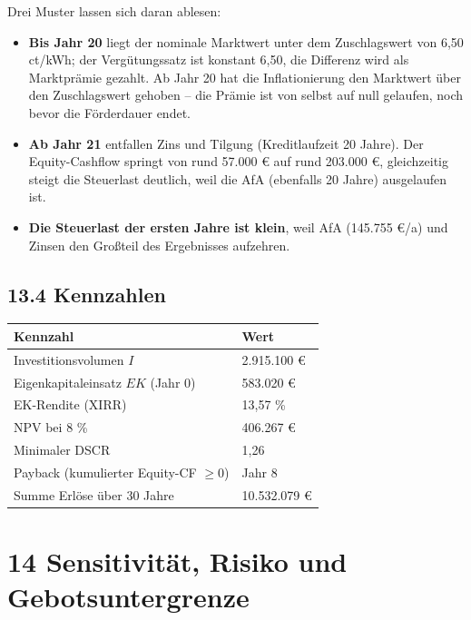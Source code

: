 \documentclass[
  a4paper,
  10pt]{article}
\providecommand{\tightlist}{%
  \setlength{\itemsep}{0pt}\setlength{\parskip}{0pt}}
\begin{document}
Drei Muster lassen sich daran ablesen:

\begin{itemize}
\tightlist
\item
  \textbf{Bis Jahr 20} liegt der nominale Marktwert unter dem
  Zuschlagswert von 6,50 ct/kWh; der Vergütungssatz ist konstant 6,50,
  die Differenz wird als Marktprämie gezahlt. Ab Jahr 20 hat die
  Inflationierung den Marktwert über den Zuschlagswert gehoben -- die
  Prämie ist von selbst auf null gelaufen, noch bevor die Förderdauer
  endet.
\item
  \textbf{Ab Jahr 21} entfallen Zins und Tilgung (Kreditlaufzeit 20
  Jahre). Der Equity-Cashflow springt von rund 57.000 € auf rund 203.000
  €, gleichzeitig steigt die Steuerlast deutlich, weil die AfA
  (ebenfalls 20 Jahre) ausgelaufen ist.
\item
  \textbf{Die Steuerlast der ersten Jahre ist klein}, weil AfA (145.755
  €/a) und Zinsen den Großteil des Ergebnisses aufzehren.
\end{itemize}

\hypertarget{kennzahlen}{%
\subsection{13.4 Kennzahlen}\label{kennzahlen}}

\begin{longtable}[]{@{}ll@{}}
\toprule\noalign{}
Kennzahl & Wert \\
\midrule\noalign{}
\endhead
\bottomrule\noalign{}
\endlastfoot
Investitionsvolumen \(I\) & 2.915.100 € \\
Eigenkapitaleinsatz \(EK\) (Jahr 0) & 583.020 € \\
EK-Rendite (XIRR) & 13,57 \% \\
NPV bei 8 \% & 406.267 € \\
Minimaler DSCR & 1,26 \\
Payback (kumulierter Equity-CF \(\geq 0\)) & Jahr 8 \\
Summe Erlöse über 30 Jahre & 10.532.079 € \\
\end{longtable}

\hypertarget{sensitivituxe4t-risiko-und-gebotsuntergrenze}{%
\section{14 Sensitivität, Risiko und
Gebotsuntergrenze}\label{sensitivituxe4t-risiko-und-gebotsuntergrenze}}
\end{document}
